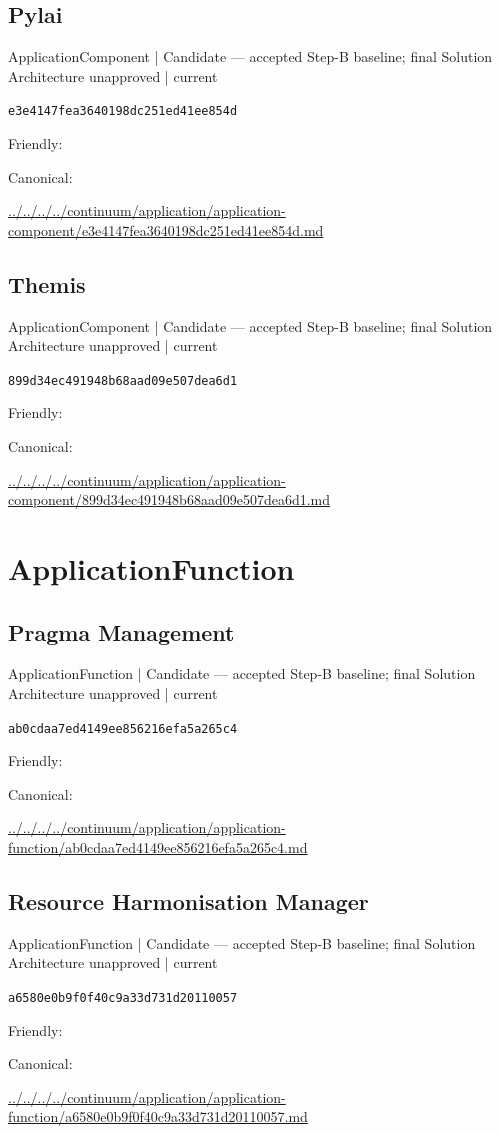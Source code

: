 \documentclass[10pt,a4paper]{article}
\begin{document}
\subsection*{Pylai}
{\small ApplicationComponent | Candidate — accepted Step-B baseline; final Solution Architecture unapproved | current}\par
\texttt{e3e4147fea3640198dc251ed41ee854d}\par
Friendly: \par
Canonical: \par
{\footnotesize\url{../../../../continuum/application/application-component/e3e4147fea3640198dc251ed41ee854d.md}}\par
\subsection*{Themis}
{\small ApplicationComponent | Candidate — accepted Step-B baseline; final Solution Architecture unapproved | current}\par
\texttt{899d34ec491948b68aad09e507dea6d1}\par
Friendly: \par
Canonical: \par
{\footnotesize\url{../../../../continuum/application/application-component/899d34ec491948b68aad09e507dea6d1.md}}\par
\section*{ApplicationFunction}
\subsection*{Pragma Management}
{\small ApplicationFunction | Candidate — accepted Step-B baseline; final Solution Architecture unapproved | current}\par
\texttt{ab0cdaa7ed4149ee856216efa5a265c4}\par
Friendly: \par
Canonical: \par
{\footnotesize\url{../../../../continuum/application/application-function/ab0cdaa7ed4149ee856216efa5a265c4.md}}\par
\subsection*{Resource Harmonisation Manager}
{\small ApplicationFunction | Candidate — accepted Step-B baseline; final Solution Architecture unapproved | current}\par
\texttt{a6580e0b9f0f40c9a33d731d20110057}\par
Friendly: \par
Canonical: \par
{\footnotesize\url{../../../../continuum/application/application-function/a6580e0b9f0f40c9a33d731d20110057.md}}\par
\end{document}
